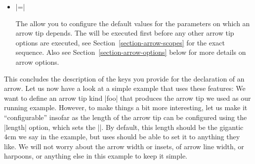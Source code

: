 \begin{command}{\pgfdeclarearrow{}}
\begin{itemize}
            For most arrow tips it does, however, make sense to bend them.
            There are (at least) two different mathematical ways of doing so,
            see Section~\ref{section-library-curvilinear} for details. Which of
            these ways is use can be configured by setting  to
            either |orthogonal| or to |polar|. It is best to try simply try out
            both when designing an arrow tip to see which works better. Since
            |orthogonal| is quicker and often gives good or even better
            results, it is the default. Some arrow tips, however, profit from
            saying |bending mode=polar|.
        \item {}|=|

            The  allow you to configure the default values for
            the parameters on which an arrow tip depends. The 
            will be executed first before any other arrow tip options are
            executed, see Section~\ref{section-arrow-scopes} for the exact
            sequence. Also see Section~\ref{section-arrow-options} below for
            more details on arrow options.
    \end{itemize}

    This concludes the description of the keys you provide for the declaration
    of an arrow. Let us now have a look at a simple example that uses these
    features: We want to define an arrow tip kind |foo| that produces the arrow
    tip we used as our running example. However, to make things a bit more
    interesting, let us make it ``configurable'' insofar as the length of the
    arrow tip can be configured using the |length| option, which sets the
    |\pgfarrowlength|. By default, this length should be the gigantic 4cm we
    say in the example, but uses should be able to set it to anything they
    like. We will not worry about the arrow width or insets, of arrow line
    width, or harpoons, or anything else in this example to keep it simple.


\end{command}
